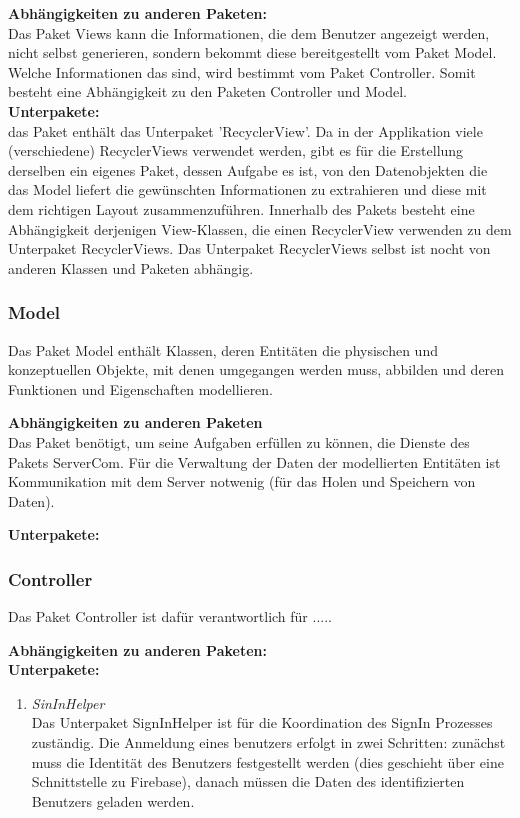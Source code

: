 \textbf{Abhängigkeiten zu anderen Paketen:}\\
Das Paket Views kann die Informationen, die dem Benutzer angezeigt werden, nicht selbst generieren, sondern bekommt diese bereitgestellt vom Paket Model. Welche Informationen das sind, wird bestimmt vom Paket Controller. Somit besteht eine Abhängigkeit zu den Paketen Controller und Model.\\

\textbf{Unterpakete:}\\
das Paket enthält das Unterpaket 'RecyclerView'. Da in der Applikation viele (verschiedene) RecyclerViews verwendet werden, gibt es für die Erstellung derselben ein eigenes Paket, dessen Aufgabe es ist, von den Datenobjekten die das Model liefert die gewünschten Informationen zu extrahieren und diese mit dem richtigen Layout zusammenzuführen. Innerhalb des Pakets besteht eine Abhängigkeit derjenigen View-Klassen, die einen RecyclerView verwenden zu dem Unterpaket RecyclerViews. Das Unterpaket RecyclerViews selbst ist nocht von anderen Klassen und Paketen abhängig.

\subsubsection{Model}
Das Paket Model enthält Klassen, deren Entitäten die physischen und konzeptuellen Objekte, mit denen umgegangen werden muss, abbilden und deren Funktionen und Eigenschaften modellieren.

\textbf{Abhängigkeiten zu anderen Paketen}\\
Das Paket benötigt, um seine Aufgaben erfüllen zu können, die Dienste des Pakets ServerCom. Für die Verwaltung der Daten der modellierten Entitäten ist Kommunikation mit dem Server notwenig (für das Holen und Speichern von Daten).

\textbf{Unterpakete:}\\

\subsubsection{Controller}
Das Paket Controller ist dafür verantwortlich für .....

\textbf{Abhängigkeiten zu anderen Paketen:}\\


\textbf{Unterpakete:}\\
\begin{enumerate}
	\item \textit{SinInHelper}\\
	Das Unterpaket SignInHelper ist für die Koordination des SignIn Prozesses zuständig. Die Anmeldung eines benutzers erfolgt in zwei Schritten: zunächst muss die Identität des Benutzers festgestellt werden (dies geschieht über eine Schnittstelle zu Firebase), danach müssen die Daten des identifizierten Benutzers geladen werden.
\end{enumerate}

